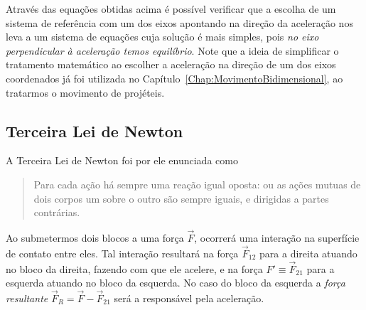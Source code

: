Através das equações obtidas acima é possível verificar que a escolha de um sistema de referência com um dos eixos apontando na direção da aceleração nos leva a um sistema de equações cuja solução é mais simples, pois \emph{no eixo perpendicular à aceleração temos equilíbrio}. Note que a ideia de simplificar o tratamento matemático ao escolher a aceleração na direção de um dos eixos coordenados já foi utilizada no Capítulo~\ref{Chap:MovimentoBidimensional}, ao tratarmos o movimento de projéteis.





\subsection{Terceira Lei de Newton}

A Terceira Lei de Newton foi por ele enunciada como
\begin{quote}
    Para cada ação há sempre uma reação igual oposta: ou as ações mutuas de dois corpos um sobre o outro são sempre iguais, e dirigidas a partes contrárias.
\end{quote}

\begin{marginfigure}
\centering
{}
\caption{Ao submetermos dois blocos a uma força $\vec{F}$, ocorrerá uma interação na superfície de contato entre eles. Tal interação resultará na força $\vec{F}_{12}$ para a direita atuando no bloco da direita, fazendo com que ele acelere, e na força $F' \equiv \vec{F}_{21}$ para a esquerda atuando no bloco da esquerda. No caso do bloco da esquerda a \emph{força resultante} $\vec{F}_R = \vec{F} - \vec{F}_{21}$ será a responsável pela aceleração.\label{Fig:ParAcaoReacao}}
\end{marginfigure}

